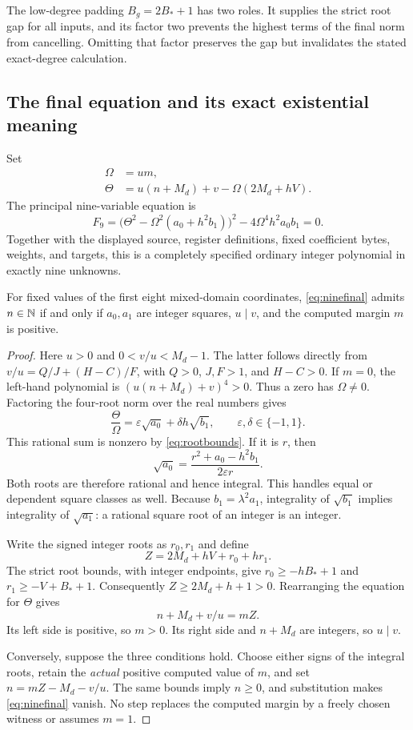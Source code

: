 The low-degree padding $B_g=2B_*+1$ has two roles. It supplies the strict
root gap for all inputs, and its factor two prevents the highest terms of
the final norm from cancelling. Omitting that factor preserves the gap
but invalidates the stated exact-degree calculation.

\subsection{The final equation and its exact existential meaning}
Set
\begin{align*}
 \Omega&=um,\\
 \Theta&=u(n+M_d)+v-\Omega(2M_d+hV).
\end{align*}
The principal nine-variable equation is
\begin{equation}\label{eq:ninefinal}
 \boxed{F_9=
 \bigl(\Theta^2-\Omega^2(a_0+h^2b_1)\bigr)^2
       -4\Omega^4h^2a_0b_1=0.}
\end{equation}
Together with the displayed source, register definitions, fixed coefficient
bytes, weights, and targets, this is a completely specified ordinary
integer polynomial in exactly nine unknowns.

\begin{proposition}\label{prop:ninenorm}
For fixed values of the first eight mixed-domain coordinates,
\eqref{eq:ninefinal} admits $n\in\mathbb N$ if and only if
$a_0,a_1$ are integer squares, $u\mid v$, and the computed margin $m$ is positive.
\end{proposition}
\begin{proof}
Here $u>0$ and $0<v/u<M_d-1$. The latter follows directly from
$v/u=Q/J+(H-C)/F$, with $Q>0$, $J,F>1$, and $H-C>0$.
If $m=0$, the left-hand polynomial is
$(u(n+M_d)+v)^4>0$. Thus a zero has $\Omega\ne0$.
Factoring the four-root norm over the real numbers gives
\[
 \frac\Theta\Omega=\varepsilon\sqrt{a_0}
                       +\delta h\sqrt{b_1},
 \qquad \varepsilon,\delta\in\{-1,1\}.
\]
This rational sum is nonzero by \eqref{eq:rootbounds}. If it is $r$, then
\[
 \sqrt{a_0}=\frac{r^2+a_0-h^2b_1}{2\varepsilon r}.
\]
Both roots are therefore rational and hence integral. This handles equal
or dependent square classes as well. Because $b_1=\lambda^2a_1$,
integrality of $\sqrt{b_1}$ implies integrality of $\sqrt{a_1}$: a rational
square root of an integer is an integer.

Write the signed integer roots as $r_0,r_1$ and define
\[
 Z=2M_d+hV+r_0+hr_1.
\]
The strict root bounds, with integer endpoints, give
$r_0\ge-hB_*+1$ and $r_1\ge-V+B_*+1$. Consequently
$Z\ge2M_d+h+1>0$. Rearranging the equation for $\Theta$ gives
\[
 n+M_d+v/u=mZ.
\]
Its left side is positive, so $m>0$. Its right side and $n+M_d$ are
integers, so $u\mid v$.

Conversely, suppose the three conditions hold. Choose either signs of
the integral roots, retain the \emph{actual} positive computed value of $m$,
and set $n=mZ-M_d-v/u$. The same bounds imply $n\ge0$, and substitution
makes \eqref{eq:ninefinal} vanish. No step replaces the computed margin
by a freely chosen witness or assumes $m=1$.
\end{proof}

